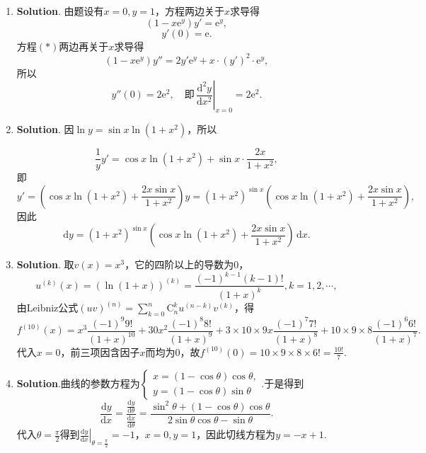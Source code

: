 \documentclass[../main.tex]{subfiles}
\begin{document}
\begin{enumerate}
          所以
          \[
              y'(x)=\frac{\frac{2x}{2\sqrt{1-x^{2}}}\cdot x-(1-\sqrt{1-x^{2}})}{x^{2}}
              =\frac{1-\sqrt{1-x^{2}}}{x^{2}\sqrt{1-x^2}}.
          \]

    \item \textbf{Solution}. 由题设有$x=0,y=1$，方程两边关于$x$求导得
          \[
              (1-x\mathrm{e}^y)y'=\mathrm{e}^y,\tag{$*$}
          \]
          \[
              y'(0)=\mathrm{e}.
          \]
          方程$(*)$两边再关于$x$求导得
          \[
              (1-x\mathrm{e}^{y})y''=2y'\mathrm{e}^{y}+x\cdot(y')^{2}\cdot\mathrm{e}^{y}
              ,
          \]
          所以
          \[
              y''(0)=2\mathrm{e}^{2},\quad\text{即}\,\left.\frac{\mathrm{d}^{2} y}{\mathrm{d}x^{2}}
              \right|_{x=0}=2\mathrm{e}^{2}.
          \]

    \item \textbf{Solution}. 因$\ln y=\sin x\ln(1+x^{2})$，所以

          \[
              \frac{1}{y}y'=\cos x\ln(1+x^{2})+\sin x\cdot\frac{2x}{1+x^{2}},
          \]
          即
          \[
              y'=\left(\cos x\ln(1+x^{2})+\frac{2x\sin x}{1+x^{2}}\right)y=(1+x^{2})^{\sin x}\left(\cos x\ln(1+x^{2})+\frac{2x\sin x}{1+x^{2}}\right),
          \]
          因此
          \[
              \mathrm{d}y=(1+x^{2})^{\sin x}\left(\cos x\ln(1+x^{2})+\frac{2x\sin x}{1+x^{2}}\right)\,\mathrm{d}x.
          \]


    \item \textbf{Solution}. 取$v(x)=x^{3}$，它的四阶以上的导数为0，
          \[
              u^{(k)}(x)=\left(\ln(1+x)\right)^{(k)}=\frac{(-1)^{k-1}(k-1)!}{(1+x)^{k}}
              ,k=1,2,\cdots,
          \]
          由Leibniz公式$(uv)^{(n)}=\sum_{k=0}^{n}\mathrm{C}_{n}^{k}u^{(n-k)}v^{(k)}$，得
          \[
              f^{(10)}(x)=x^{3}\frac{(-1)^{9} 9!}{(1+x)^{10}}+30x^{2}\frac{(-1)^{8} 8!}{(1+x)^{9}}
              +3\times10\times9x\frac{(-1)^{7} 7!}{(1+x)^{8}}+10\times9\times8\frac{(-1)^{6}
                  6!}{(1+x)^{7}}.
          \]
          代入$x=0$，前三项因含因子$x$而均为$0$，故$f^{(10)}(0)=10\times9\times8\times6!=\frac{10!}{7}$.

    \item \textbf{Solution}.曲线的参数方程为$\begin{cases}
                  x=(1-\cos\theta)\cos\theta, \\
                  y=(1-\cos\theta)\sin\theta
              \end{cases}$.于是得到
          \[
              \frac{\mathrm{d}y}{\mathrm{d}x}=\frac{\frac{\mathrm{d}y}{\mathrm{d}\theta}}{\frac{\mathrm{d}x}{\mathrm{d}\theta}}
              =\frac{\sin^{2}\theta+(1-\cos\theta)\cos\theta}{2\sin\theta\cos\theta-\sin\theta}
              .
          \]
          代入$\theta=\frac{\pi}{2}$得到$\left.\frac{\mathrm{d}y}{\mathrm{d}x}\right|
              _{\theta=\frac{\pi}{2}}=-1$，$x=0,y=1$，因此切线方程为$y=-x+1$.
\end{enumerate}
\end{document}
